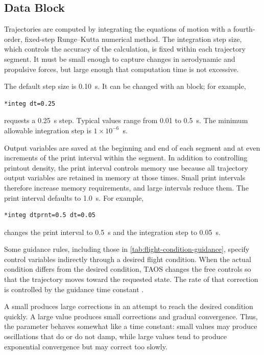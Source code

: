 \subsection{ Data Block}\label{sec:block-integ}

Trajectories are computed by integrating the equations of motion with a fourth-order,
fixed-step Runge--Kutta numerical method. The integration step size, which controls
the accuracy of the calculation, is fixed within each trajectory segment. It must be
small enough to capture changes in aerodynamic and propulsive forces, but large
enough that computation time is not excessive.

The default step size is 0.10~s. It can be changed with an
 block; for example,

\begin{lstlisting}[style=taosmanual]
*integ dt=0.25
\end{lstlisting}

requests a 0.25~s step. Typical values range from 0.01 to 0.5~s. The minimum
allowable integration step is $1\times10^{-6}$~s.

Output variables are saved at the beginning and end of each segment and at even
increments of the print interval within the segment. In addition to controlling
printout density, the print interval controls memory use because all trajectory output
variables are retained in memory at those times. Small print intervals therefore
increase memory requirements, and large intervals reduce them. The print interval
 defaults to 1.0~s. For example,

\begin{lstlisting}[style=taosmanual]
*integ dtprnt=0.5 dt=0.05
\end{lstlisting}

changes the print interval to 0.5~s and the integration step to 0.05~s.


Some guidance rules, including those in \cref{tab:flight-condition-guidance},
specify control variables indirectly through a desired flight condition. When the
actual condition differs from the desired condition, TAOS changes the free controls
so that the trajectory moves toward the requested state. The rate of that correction is
controlled by the guidance time constant .

A small  produces large corrections in an attempt to reach the
desired condition quickly. A large value produces small corrections and gradual
convergence. Thus, the parameter behaves somewhat like a time constant: small
values may produce oscillations that do or do not damp, while large values tend to
produce exponential convergence but may correct too slowly.

